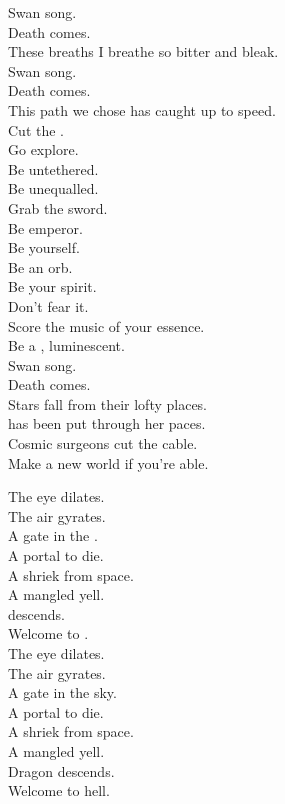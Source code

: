 Swan song. \\
Death comes. \\
These breaths I breathe so bitter and bleak. \\
Swan song. \\
Death comes. \\
This path we chose has caught up to speed. \\

Cut the . \\
Go explore. \\
Be untethered. \\
Be unequalled. \\
Grab the sword. \\
Be emperor. \\
Be yourself. \\
Be an orb. \\
Be your spirit. \\
Don't fear it. \\
Score the music of your essence. \\
Be a , luminescent. \\
Swan song. \\
Death comes. \\

Stars fall from their lofty places. \\
 has been put through her paces. \\
Cosmic surgeons cut the cable. \\
Make a new world if you're able. \\


The eye dilates. \\
The air gyrates. \\
A gate in the . \\
A portal to die. \\
A shriek from space. \\
A mangled yell. \\
 descends. \\
Welcome to . \\

The eye dilates. \\
The air gyrates. \\
A gate in the sky. \\
A portal to die. \\
A shriek from space. \\
A mangled yell. \\
Dragon descends. \\
Welcome to hell. \\

